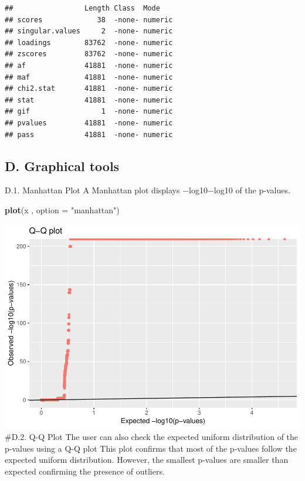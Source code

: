 \documentclass[]{article}
\newenvironment{Shaded}{\begin{snugshade}}{\end{snugshade}}
\newcommand{\KeywordTok}[1]{\textcolor[rgb]{0.13,0.29,0.53}{\textbf{#1}}}
\newcommand{\DataTypeTok}[1]{\textcolor[rgb]{0.13,0.29,0.53}{#1}}
\newcommand{\StringTok}[1]{\textcolor[rgb]{0.31,0.60,0.02}{#1}}
\newcommand{\NormalTok}[1]{#1}
\begin{document}
\begin{verbatim}
##                 Length Class  Mode   
## scores             38  -none- numeric
## singular.values     2  -none- numeric
## loadings        83762  -none- numeric
## zscores         83762  -none- numeric
## af              41881  -none- numeric
## maf             41881  -none- numeric
## chi2.stat       41881  -none- numeric
## stat            41881  -none- numeric
## gif                 1  -none- numeric
## pvalues         41881  -none- numeric
## pass            41881  -none- numeric
\end{verbatim}

\subsection{D. Graphical tools}\label{d.-graphical-tools}

D.1. Manhattan Plot A Manhattan plot displays −log10−log10 of the
p-values.

\begin{Shaded}
\begin{Highlighting}[]
\KeywordTok{plot}\NormalTok{(x , }\DataTypeTok{option =} \StringTok{"manhattan"}\NormalTok{)}
\end{Highlighting}
\end{Shaded}

\includegraphics{pcadapt_files/figure-latex/unnamed-chunk-4-1.pdf}
\#D.2. Q-Q Plot The user can also check the expected uniform
distribution of the p-values using a Q-Q plot This plot confirms that
most of the p-values follow the expected uniform distribution. However,
the smallest p-values are smaller than expected confirming the presence
of outliers.
\end{document}
